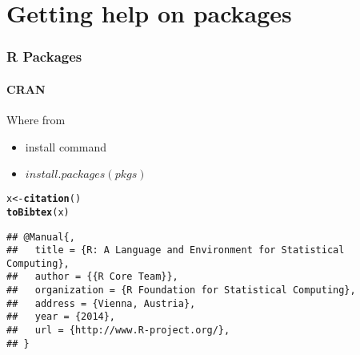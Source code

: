\documentclass[12pt]{beamer}\usepackage[]{graphicx}\usepackage[]{color}
\makeatletter
\newcommand{\hlstd}[1]{\textcolor[rgb]{0.345,0.345,0.345}{#1}}%
\newcommand{\hlkwb}[1]{\textcolor[rgb]{0.69,0.353,0.396}{#1}}%
\newcommand{\hlkwd}[1]{\textcolor[rgb]{0.737,0.353,0.396}{\textbf{#1}}}%
\newenvironment{kframe}{%
 \def\at@end@of@kframe{}%
 \ifinner\ifhmode%
  \def\at@end@of@kframe{\end{minipage}}%
  \begin{minipage}{\columnwidth}%
 \fi\fi%
 \def\FrameCommand##1{\hskip\@totalleftmargin \hskip-\fboxsep
 \colorbox{shadecolor}{##1}\hskip-\fboxsep
     \hskip-\linewidth \hskip-\@totalleftmargin \hskip\columnwidth}%
 \MakeFramed {\advance\hsize-\width
   \@totalleftmargin\z@ \linewidth\hsize
   \@setminipage}}%
 {\par\unskip\endMakeFramed%
 \at@end@of@kframe}
\newenvironment{knitrout}{}{} %
\makeatother
\begin{document}
\section*{Getting help on packages}
\begin{frame}
  \frametitle{R Packages}
  \framesubtitle{CRAN}
  
   \begin{block}{Where from}
  \begin{itemize} 
  \item install command
  \item $install.packages(pkgs)$
  \end{itemize}
  \end{block}
  
\begin{knitrout}
\color{fgcolor}\begin{kframe}
\begin{alltt}
 \hlstd{x}\hlkwb{<-}\hlkwd{citation}\hlstd{()}
 \hlkwd{toBibtex}\hlstd{(x)}
\end{alltt}
\begin{verbatim}
## @Manual{,
##   title = {R: A Language and Environment for Statistical Computing},
##   author = {{R Core Team}},
##   organization = {R Foundation for Statistical Computing},
##   address = {Vienna, Austria},
##   year = {2014},
##   url = {http://www.R-project.org/},
## }
\end{verbatim}
\end{kframe}
\end{knitrout}
\end{frame}
\end{document}
